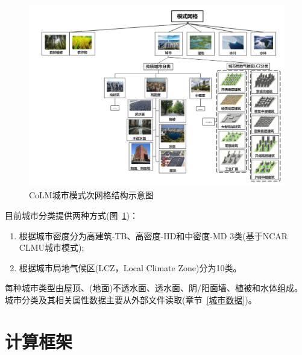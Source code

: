 {
\begin{figure}[htbp]
\centering
\includegraphics[width=\textwidth]{Figures/模式构架/CoLM城市次网格示意图.jpg}
\caption{CoLM城市模式次网格结构示意图}
\label{fig:城市次网格}
\end{figure}
}

目前城市分类提供两种方式(图~\ref{fig:城市次网格})：
\begin{enumerate}
    \item 根据城市密度分为高建筑-TB、高密度-HD和中密度-MD 3类(基于NCAR CLMU城市模式);
    \item 根据城市局地气候区(LCZ，Local Climate Zone)分为10类。
\end{enumerate}
每种城市类型由屋顶、(地面)不透水面、透水面、阴/阳面墙、植被和水体组成。
城市分类及其相关属性数据主要从外部文件读取(章节~\ref{城市数据})。


\section{计算框架}\label{计算框架}

